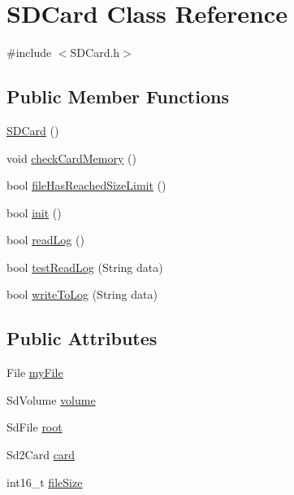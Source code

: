 \hypertarget{class_s_d_card}{}\section{S\+D\+Card Class Reference}
\label{class_s_d_card}


{\ttfamily \#include $<$S\+D\+Card.\+h$>$}

\subsection*{Public Member Functions}
\begin{DoxyCompactItemize}
\item 
\mbox{\hyperlink{class_s_d_card_aa57f64cf28817d210706222f60be9001}{S\+D\+Card}} ()
\item 
void \mbox{\hyperlink{class_s_d_card_a62c472309bd91560a29430d6946c05fb}{check\+Card\+Memory}} ()
\item 
bool \mbox{\hyperlink{class_s_d_card_ab43bfe585365622d71e30194a404125c}{file\+Has\+Reached\+Size\+Limit}} ()
\item 
bool \mbox{\hyperlink{class_s_d_card_a7d5b2551a395d7bf883f425fb98b0b0d}{init}} ()
\item 
bool \mbox{\hyperlink{class_s_d_card_a9c0edb3dd7e157501776d9760705a757}{read\+Log}} ()
\item 
bool \mbox{\hyperlink{class_s_d_card_ad5832b1d4274a99ca975f4c570584f53}{test\+Read\+Log}} (String data)
\item 
bool \mbox{\hyperlink{class_s_d_card_aa65251052d32bcaff9f087080118525f}{write\+To\+Log}} (String data)
\end{DoxyCompactItemize}
\subsection*{Public Attributes}
\begin{DoxyCompactItemize}
\item 
File \mbox{\hyperlink{class_s_d_card_a2e9756d5c5478bee2d7977a0c66ec47f}{my\+File}}
\item 
Sd\+Volume \mbox{\hyperlink{class_s_d_card_a143b4a79b09f0c1d6d71155b51dfefcb}{volume}}
\item 
Sd\+File \mbox{\hyperlink{class_s_d_card_a6e02af8a10a45955da7c560ea148ca4d}{root}}
\item 
Sd2\+Card \mbox{\hyperlink{class_s_d_card_a20919e15549972b09ad3c063c35fcf59}{card}}
\item 
int16\+\_\+t \mbox{\hyperlink{class_s_d_card_aa6f7283f73936957a10fa7c65df5f57c}{file\+Size}}
\end{DoxyCompactItemize}


